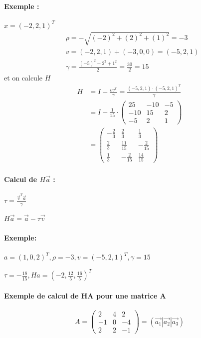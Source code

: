 \documentclass[a4paper,9pt]{extarticle}
\begin{document}
\begin{multicols*}{2}
\paragraph*{Exemple : } $x=(-2,2,1)^T$
\begin{align*}
&\rho = -\sqrt{(-2)^2 + (2)^2 + (1)^2} = -3 \\
& v = (-2,2,1) + (-3,0,0) = (-5,2,1) \\
& \gamma = \frac{(-5)^2+2^2+1^2}{2} = \frac{30}{2} = 15
\end{align*}
et on calcule $H$
\begin{align*}
H &= I - \frac{vv^T}{\gamma} = \frac{(-5,2,1) \cdot (-5,2,1)^T}{\gamma} \\
& = I - 
\frac{1}{15} \cdot \begin{pmatrix}
25 & -10 & -5 \\
-10 & 15 & 2 \\
-5 & 2 & 1
\end{pmatrix}\\
&=
\begin{pmatrix}
-\frac{2}{3} & \frac{2}{3} & \frac{1}{3} \\
\frac{2}{3} & \frac{11}{15} & -\frac{2}{15} \\
\frac{1}{3} & -\frac{2}{15} & \frac{14}{15}
\end{pmatrix}
\end{align*}

\paragraph*{Calcul de $H\vec{a}$ :}


$\tau = \frac{\vec{v}^T \vec{a}}{\gamma}$

$H\vec{a}=\vec{a}-\tau \vec{v}$

\paragraph*{Exemple:}

$a=(1,0,2)^T, \rho=-3, v=(-5,2,1)^T, \gamma = 15$ 

$\tau = -\frac{18}{15}, Ha = (-2,\frac{12}{5},\frac{16}{5})^T$

\paragraph*{Exemple de calcul de HA pour une matrice A}
$$
A = \begin{pmatrix}
2 & 4 & 2 \\
-1 & 0 & -4 \\
2 & 2 & -1
\end{pmatrix} = (\vec{a_1}|\vec{a_2}|\vec{a_3})
$$


\end{multicols*}
\end{document}
